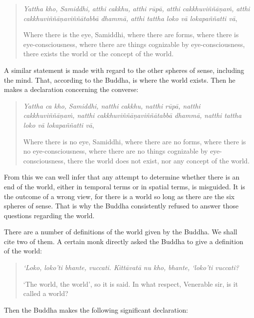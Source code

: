 \begin{quote}
\emph{Yattha kho, Samiddhi, atthi cakkhu, atthi rūpā, atthi cakkhuviññāṇaṁ, atthi cakkhuviññāṇaviññātabbā dhammā, atthi tattha loko vā lokapaññatti vā},

Where there is the eye, Samiddhi, where there are forms, where there is eye-consciousness, where there are things cognizable by eye-consciousness, there exists the world or the concept of the world.
\end{quote}

A similar statement is made with regard to the other spheres of sense, including the mind. That, according to the Buddha, is where the world exists. Then he makes a declaration concerning the converse:

\begin{quote}
\emph{Yattha ca kho, Samiddhi, natthi cakkhu, natthi rūpā, natthi cakkhuviññāṇaṁ, natthi cakkhuviññāṇaviññātabbā dhammā, natthi tattha loko vā lokapaññatti vā},

Where there is no eye, Samiddhi, where there are no forms, where there is no eye-consciousness, where there are no things cognizable by eye-consciousness, there the world does not exist, nor any concept of the world.
\end{quote}

From this we can well infer that any attempt to determine whether there is an end of the world, either in temporal terms or in spatial terms, is misguided. It is the outcome of a wrong view, for there is a world so long as there are the six spheres of sense. That is why the Buddha consistently refused to answer those questions regarding the world.

There are a number of definitions of the world given by the Buddha. We shall cite two of them. A certain monk directly asked the Buddha to give a definition of the world:

\begin{quote}
\emph{`Loko, loko'ti bhante, vuccati. Kittāvatā nu kho, bhante, `loko'ti vuccati?}

`The world, the world', so it is said. In what respect, Venerable sir, is it called a world?
\end{quote}

Then the Buddha makes the following significant declaration:

